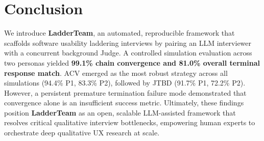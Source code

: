 \documentclass[sigconf,authordraft]{acmart}
\begin{document}
\section{Conclusion}
We introduce \textbf{LadderTeam}, an automated, reproducible framework that scaffolds software usability laddering interviews by pairing an LLM interviewer with a concurrent background Judge. A controlled simulation evaluation across two personas yielded \textbf{99.1\% chain convergence and 81.0\% overall terminal response match}. ACV emerged as the most robust strategy across all simulations (94.4\% P1, 83.3\% P2), followed by JTBD (91.7\% P1, 72.2\% P2). However, a persistent premature termination failure mode demonstrated that convergence alone is an insufficient success metric. Ultimately, these findings position \textbf{LadderTeam} as an open, scalable LLM-assisted framework that resolves critical qualitative interview bottlenecks, empowering human experts to orchestrate deep qualitative UX research at scale.






\end{document}
